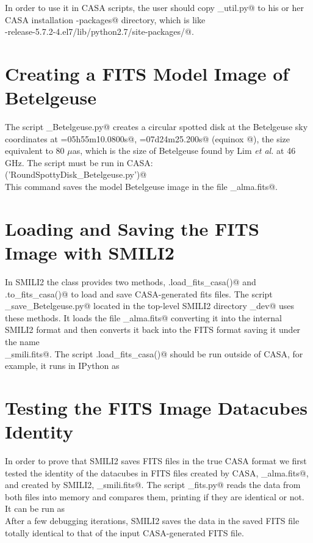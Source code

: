 \documentclass[preprint]{aastex}
\begin{document}
In order to use it in CASA scripts, the user should copy \verb@alma_util.py@ to his or her CASA installation \verb@site-packages@ directory, which is like \\
\verb@casa-release-5.7.2-4.el7/lib/python2.7/site-packages/@.


\section{Creating a FITS Model Image of Betelgeuse}

The script \verb@RoundSpottyDisk_Betelgeuse.py@ creates a circular spotted disk at the Betelgeuse sky coordinates at  \verb@RA=05h55m10.0800s@, \verb@DEC=07d24m25.200s@ (equinox @), the size equivalent to 80 $\mu$as, which is the size of Betelgeuse found by Lim \emph{et al.} at 46 GHz. The script must be run in CASA: \\
\verb@execfile('RoundSpottyDisk_Betelgeuse.py')@ \\
This command saves the model Betelgeuse image in the file \verb@RoundSpottyDisk_alma.fits@.


\section{Loading and Saving the FITS Image with SMILI2}

In SMILI2 the class \verb@imdata@ provides two methods, \verb@imdata.load_fits_casa()@ and \\ \verb@imdata.to_fits_casa()@ to load and save CASA-generated fits files. The script \\
\verb@load_save_Betelgeuse.py@ located in the top-level SMILI2 directory _dev@ uses these methods. It loads the file \verb@RoundSpottyDisk_alma.fits@ converting it into the internal SMILI2 format and then converts it back into the FITS format saving it under the name \\
\verb@RoundSpottyDisk_smili.fits@. The script \verb@imdata.load_fits_casa()@ should be run outside of CASA, for example, it runs in IPython as \\
\verb@%run load_save_Betelgeuse.py @


\section{Testing the FITS Image Datacubes Identity}

In order to prove that SMILI2 saves FITS files in the true CASA format we first tested the identity of the datacubes in FITS files created by CASA, \verb@RoundSpottyDisk_alma.fits@, and created by SMILI2, \verb@RoundSpottyDisk_smili.fits@. The script \verb@diff_fits.py@ reads the data from both files into memory and compares them, printing if they are identical or not. It can be run as \\ 
\verb@%run diff_fits.py@ \\
After a few debugging iterations, SMILI2 saves the data in the saved FITS file totally identical to that of the input CASA-generated FITS file.
\end{document}
